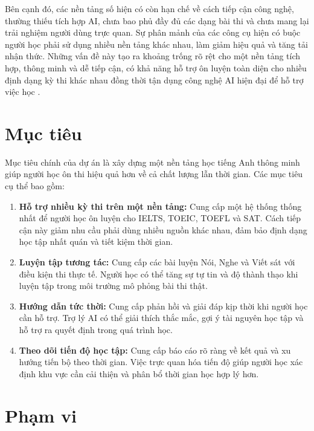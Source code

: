Bên cạnh đó, các nền tảng số hiện có còn hạn chế về cách tiếp cận công nghệ, thường thiếu tích hợp AI, chưa bao phủ đầy đủ các dạng bài thi và chưa mang lại trải nghiệm người dùng trực quan. Sự phân mảnh của các công cụ hiện có buộc người học phải sử dụng nhiều nền tảng khác nhau, làm giảm hiệu quả và tăng tải nhận thức. Những vấn đề này tạo ra khoảng trống rõ rệt cho một nền tảng tích hợp, thông minh và dễ tiếp cận, có khả năng hỗ trợ ôn luyện toàn diện cho nhiều định dạng kỳ thi khác nhau đồng thời tận dụng công nghệ AI hiện đại để hỗ trợ việc học \cite{ai_education}.

\section{Mục tiêu}

Mục tiêu chính của dự án là xây dựng một nền tảng học tiếng Anh thông minh giúp người học ôn thi hiệu quả hơn về cả chất lượng lẫn thời gian. Các mục tiêu cụ thể bao gồm:

\begin{enumerate}
    \item \textbf{Hỗ trợ nhiều kỳ thi trên một nền tảng:} Cung cấp một hệ thống thống nhất để người học ôn luyện cho IELTS, TOEIC, TOEFL và SAT. Cách tiếp cận này giảm nhu cầu phải dùng nhiều nguồn khác nhau, đảm bảo định dạng học tập nhất quán và tiết kiệm thời gian.
    
    \item \textbf{Luyện tập tương tác:} Cung cấp các bài luyện Nói, Nghe và Viết sát với điều kiện thi thực tế. Người học có thể tăng sự tự tin và độ thành thạo khi luyện tập trong môi trường mô phỏng bài thi thật.
    
    \item \textbf{Hướng dẫn tức thời:} Cung cấp phản hồi và giải đáp kịp thời khi người học cần hỗ trợ. Trợ lý AI có thể giải thích thắc mắc, gợi ý tài nguyên học tập và hỗ trợ ra quyết định trong quá trình học.
    
    \item \textbf{Theo dõi tiến độ học tập:} Cung cấp báo cáo rõ ràng về kết quả và xu hướng tiến bộ theo thời gian. Việc trực quan hóa tiến độ giúp người học xác định khu vực cần cải thiện và phân bổ thời gian học hợp lý hơn.
\end{enumerate}


\section{Phạm vi}

